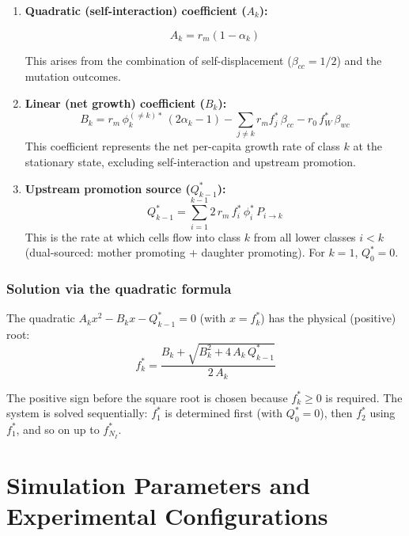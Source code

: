 \documentclass[11pt,a4paper]{article}
\begin{document}
\begin{enumerate}
    \item \textbf{Quadratic (self-interaction) coefficient ($A_k$):}
    
\begin{equation}
    A_k = r_m (1 - \alpha_k)
\end{equation}

This arises from the combination of self-displacement ($\beta_{cc} = 1/2$) and the mutation outcomes.

\item \textbf{Linear (net growth) coefficient ($B_k$):}
\begin{equation}
    B_k = r_m\,\phi_k^{(\neq k)*}\,(2\alpha_k - 1) - \sum_{j \neq k} r_m f_j^*\,\beta_{cc} - r_0\,f_W^*\,\beta_{wc}
\end{equation}
This coefficient represents the net per-capita growth rate of class $k$ at the stationary state, excluding self-interaction and upstream promotion.
\item \textbf{Upstream promotion source ($Q_{k-1}^*$):}
\begin{equation}
    Q_{k-1}^* = \sum_{i=1}^{k-1} 2\, r_m\,f_i^*\,\phi_i^*\,P_{i \to k}
\end{equation}
This is the rate at which cells flow into class $k$ from all lower classes $i < k$ (dual-sourced: mother promoting + daughter promoting). For $k=1$, $Q_0^* = 0$.
\end{enumerate}

\subsubsection*{Solution via the quadratic formula}

The quadratic $A_k x^2 - B_k x - Q_{k-1}^* = 0$ (with $x = f_k^*$) has the physical (positive) root:
\begin{equation}
    f_k^* = \frac{B_k + \sqrt{B_k^2 + 4\,A_k\,Q_{k-1}^*}}{2\,A_k}
    \label{eq:sta_distr}
\end{equation}

The positive sign before the square root is chosen because $f_k^* \geq 0$ is required. The system is solved sequentially: $f_1^*$ is determined first (with $Q_0^* = 0$), then $f_2^*$ using $f_1^*$, and so on up to $f_{N_I}^*$.

\section{Simulation Parameters and Experimental Configurations}
\label{sec:sim_params}
\end{document}
